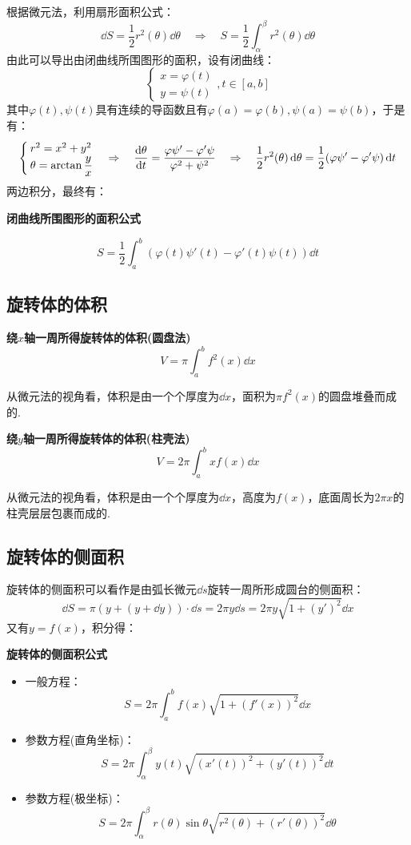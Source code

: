 根据微元法，利用扇形面积公式：
\[\dd{S} = \frac{1}{2}r^2(\theta)\dd{\theta} \quad\Rightarrow\quad S = \frac{1}{2}\int_{\alpha}^{\beta}r^2(\theta)\dd{\theta}\]
由此可以导出由闭曲线所围图形的面积，设有闭曲线：
\[\begin{cases}
    x = \varphi(t)\\
    y = \psi(t)
\end{cases},t\in[a,b]\]
其中$\varphi(t),\psi(t)$具有连续的导函数且有$\varphi(a)=\varphi(b),\psi(a)=\psi(b)$，于是有：
\[\begin{cases}
    r^2 = x^2 + y^2\\
    \theta = \arctan\dfrac{y}{x}
\end{cases} \Rightarrow\quad \dv{\theta}{t} = \frac{\varphi\psi'-\varphi'\psi}{\varphi^2 + \psi^2} \quad\Rightarrow\quad \frac{1}{2}r^2(\theta)\dd{\theta} = \frac{1}{2}(\varphi\psi'-\varphi'\psi)\dd{t}\]
两边积分，最终有：
\begin{theorem}
    \textbf{闭曲线所围图形的面积公式}

    \[S = \frac{1}{2}\int_{a}^{b}(\varphi(t)\psi'(t) - \varphi'(t)\psi(t))\dd{t}\]
\end{theorem}


\subsection{旋转体的体积}
\begin{theorem}
    \textbf{绕$x$轴一周所得旋转体的体积(圆盘法)}
    \[V = \pi\int_{a}^{b}f^2(x)\dd{x}\]
\end{theorem}
从微元法的视角看，体积是由一个个厚度为$\dd{x}$，面积为$\pi f^2(x)$的圆盘堆叠而成的.

\begin{theorem}
    \textbf{绕$y$轴一周所得旋转体的体积(柱壳法)}
    \[V = 2\pi\int_{a}^{b}xf(x)\dd{x}\]
\end{theorem}
从微元法的视角看，体积是由一个个厚度为$\dd{x}$，高度为$f(x)$，底面周长为$2\pi x$的柱壳层层包裹而成的.


\subsection{旋转体的侧面积}
旋转体的侧面积可以看作是由弧长微元$\dd{s}$旋转一周所形成圆台的侧面积：
\[\dd{S} = \pi(y + (y+\dd{y}))\cdot\dd{s} = 2\pi y\dd{s} = 2\pi y\sqrt{1+(y')^2}\dd{x}\]
又有$y=f(x)$，积分得：
\begin{theorem}
    \textbf{旋转体的侧面积公式}
    \begin{itemize}
        \item 一般方程：
        \[S = 2\pi\int_{a}^{b}f(x)\sqrt{1+(f'(x))^2}\dd{x}\]
        \item 参数方程(直角坐标)：
        \[S = 2\pi\int_{\alpha}^{\beta}y(t)\sqrt{(x'(t))^2 + (y'(t))^2}\dd{t}\]
        \item 参数方程(极坐标)：
        \[S = 2\pi\int_{\alpha}^{\beta}r(\theta)\sin\theta\sqrt{r^2(\theta) + (r'(\theta))^2}\dd{\theta}\]
    \end{itemize}
\end{theorem}


